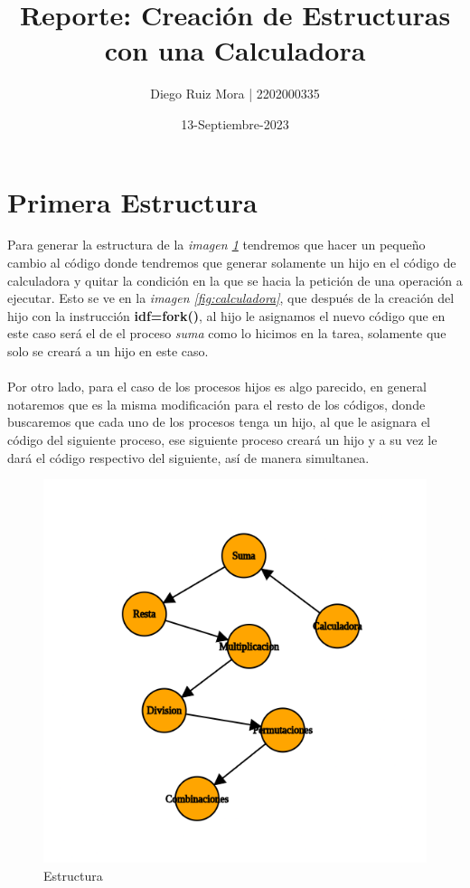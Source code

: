 \documentclass[10pt]{article}
\title{\textbf{Reporte: Creación de Estructuras con una Calculadora}}
\author{Diego Ruiz Mora | 2202000335}
\date{13-Septiembre-2023}
\begin{document}
	
	\maketitle
	\section{Primera Estructura}
	Para generar la estructura de la \emph{imagen \ref{fig:est1}} tendremos que hacer un pequeño cambio al código donde tendremos que generar solamente un hijo en el código de calculadora y quitar la condición en la que se hacia la petición de una operación a ejecutar. Esto se ve en la \emph{imagen \ref{fig:calculadora}}, que después de la creación del hijo con la instrucción \textbf{idf=fork()}, al hijo le asignamos el nuevo código que en este caso será el de el proceso \emph{suma} como lo hicimos en la tarea, solamente que solo se creará a un hijo en este caso. 
	\\\\
	Por otro lado, para el caso de los procesos hijos es algo parecido, en general notaremos que es la misma modificación para el resto de los códigos, donde buscaremos que cada uno de los procesos tenga un hijo, al que le asignara el código del siguiente proceso, ese siguiente proceso creará un hijo y a su vez le dará el código respectivo del siguiente, así de manera simultanea. 
	\begin{figure}[h!]
		\centering
		\includegraphics[width=0.5\linewidth]{graph.png}
		\caption{Estructura}
		\label{fig:est1}
	\end{figure}
\end{document}
